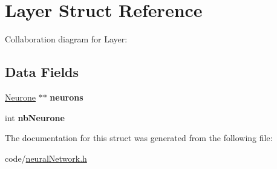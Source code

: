 \hypertarget{structLayer}{}\section{Layer Struct Reference}
\label{structLayer}


Collaboration diagram for Layer\+:
\subsection*{Data Fields}
\begin{DoxyCompactItemize}
\item 
\hyperlink{structNeurone}{Neurone} $\ast$$\ast$ {\bfseries neurons}\hypertarget{structLayer_a2505d936f07e655fdab4cab54d5754ba}{}\label{structLayer_a2505d936f07e655fdab4cab54d5754ba}

\item 
int {\bfseries nb\+Neurone}\hypertarget{structLayer_aff01f6d5312cbce65641e68c024c73cd}{}\label{structLayer_aff01f6d5312cbce65641e68c024c73cd}

\end{DoxyCompactItemize}


The documentation for this struct was generated from the following file\+:\begin{DoxyCompactItemize}
\item 
code/\hyperlink{neuralNetwork_8h}{neural\+Network.\+h}\end{DoxyCompactItemize}
